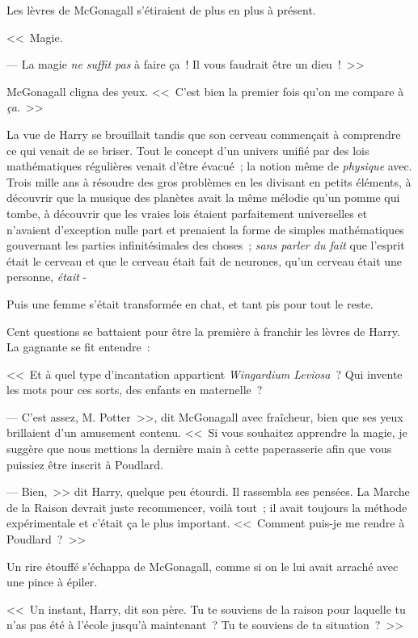 Les lèvres de McGonagall s'étiraient de plus en plus à présent.

<<~Magie.

--- La magie \emph{ne suffit pas} à faire ça~! Il vous faudrait être un dieu~!~>>

McGonagall cligna des yeux. <<~C'est bien la premier fois qu'on me compare à \emph{ça}.~>>

La vue de Harry se brouillait tandis que son cerveau commençait à comprendre ce qui venait de se briser. Tout le concept d'un univers unifié par des lois mathématiques régulières venait d'être évacué~; la notion même de \emph{physique} avec. Trois mille ans à résoudre des gros problèmes en les divisant en petits éléments, à découvrir que la musique des planètes avait la même mélodie qu'un pomme qui tombe, à découvrir que les vraies lois étaient parfaitement universelles et n'avaient d'exception nulle part et prenaient la forme de simples mathématiques gouvernant les parties infinitésimales des choses~; \emph{sans parler du fait} que l'esprit était le cerveau et que le cerveau était fait de neurones, qu'un cerveau était une personne, \emph{était} -

Puis une femme s'était transformée en chat, et tant pis pour tout le reste.

Cent questions se battaient pour être la première à franchir les lèvres de Harry. La gagnante se fit entendre~:

<<~Et à quel type d'incantation appartient \emph{Wingardium Leviosa}~? Qui invente les mots pour ces sorts, des enfants en maternelle~?

--- C'est assez, M. Potter~>>, dit McGonagall avec fraîcheur, bien que ses yeux brillaient d'un amusement contenu. <<~Si vous souhaitez apprendre la magie, je suggère que nous mettions la dernière main à cette paperasserie afin que vous puissiez être inscrit à Poudlard.

--- Bien,~>> dit Harry, quelque peu étourdi. Il rassembla ses pensées. La Marche de la Raison devrait juste recommencer, voilà tout~; il avait toujours la méthode expérimentale et c'était ça le plus important. <<~Comment puis-je me rendre à Poudlard~?~>>

Un rire étouffé s'échappa de McGonagall, comme si on le lui avait arraché avec une pince à épiler.

<<~Un instant, Harry, dit son père. Tu te souviens de la raison pour laquelle tu n'as pas été à l'école jusqu'à maintenant~? Tu te souviens de ta situation~?~>>

